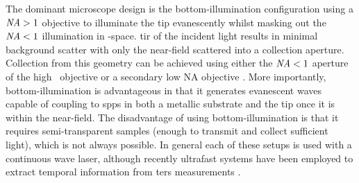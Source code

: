 \documentclass{article}
\begin{document}
The dominant microscope design is the bottom-illumination configuration using a $\mathit{NA}>1$ objective to illuminate the tip evanescently whilst masking out the $\mathit{NA}<1$ illumination in \wvm-space. \Gls{tir} of the incident light results in minimal background scatter with only the near-field scattered into a collection aperture. Collection from this geometry can be achieved using either the $\mathit{NA}<1$ aperture of the high \NA\ objective \cite{hayazawa2001, yeo2006, yeo2007, zhang2013experimental, mino2014, kumar2014} or a secondary low NA objective \cite{hayazawa2007, taguchi2009, uetsuki2012}. More importantly, bottom-illumination is advantageous in that it generates evanescent waves capable of coupling to \glspl{spp} in both a metallic substrate and the tip once it is within the near-field. The disadvantage of using bottom-illumination is that it requires semi-transparent samples (enough to transmit and collect sufficient light), which is not always possible.
In general each of these setups is used with a continuous wave laser, although recently ultrafast systems have been employed to extract temporal information from \gls{ters} measurements \cite{klingsporn2013}.
\end{document}
